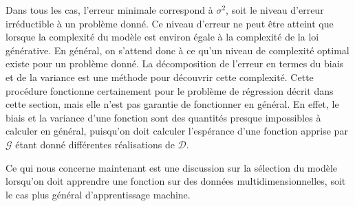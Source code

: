 Dans tous les cas, l'erreur minimale correspond à $\sigma^2$, soit le niveau d'erreur irréductible à un problème donné. 
Ce niveau d'erreur ne peut être atteint que lorsque la complexité du modèle est environ égale à la complexité de la loi 
générative. En général, on s'attend donc à ce qu'un niveau de complexité optimal existe pour un problème donné. 
La décomposition de l'erreur en termes du biais et de la variance est une méthode pour découvrir cette complexité. 
Cette procédure fonctionne certainement pour le problème de régression décrit dans cette section, mais elle n'est pas garantie de fonctionner en général. 
En effet, le biais et la variance d'une fonction sont des quantités presque impossibles à calculer en général, puisqu'on doit calculer l'espérance d'une fonction 
apprise par $\mathcal{G}$ étant donné différentes réalisations de $\mathcal{D}$.

Ce qui nous concerne maintenant est une discussion sur la sélection du modèle lorsqu'on doit apprendre 
une fonction sur des données multidimensionnelles, soit le cas plus général d'apprentissage machine.


